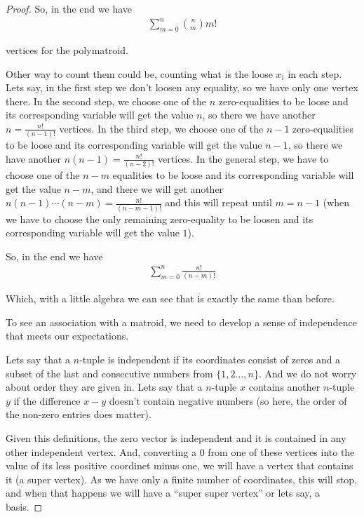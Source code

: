 \begin{proof}
        So, in the end we have
        \begin{align}
                \sum_{m = 0}^n \binom{n}{m} m!
        \end{align}
        
        vertices for the polymatroid.\pn
        
        Other way to count them could be, counting what is the loose $x_i$ in each step. Lets say, in the first step we don't loosen any equality, so 
        we have only one vertex there. In the second step, we choose one of the $n$ zero-equalities to be loose and its corresponding variable will get the value $n$, 
        so there we have another $n = \frac{n!}{(n-1)!}$ vertices. In the third step, we choose one of the $n-1$ zero-equalities to be loose and its corresponding
        variable will get the value $n-1$, so there we have another $n (n-1) = \frac{n!}{(n-2)!}$ vertices. In the general step, we have to choose one of the $n-m$ 
        equalities to be loose and its corresponding variable will get the value $n-m$, and there we will get another $n (n-1) \cdots (n-m) = \frac{n!}{(n-m-1)!}$ and 
        this will repeat until $m = n-1$ (when we have to choose the only remaining zero-equality to be loosen and its corresponding variable will get the value $1$).\pn
        
        So, in the end we have
        \begin{align}
                \sum_{m = 0}^{n} \frac{n!}{(n-m)!}
        \end{align}
        
        Which, with a little algebra we can see that is exactly the same than before.\pn
        
        To see an association with a matroid, we need to develop a sense of independence that meets our expectations.\pn
        
        Lets say that a $n$-tuple is independent if its coordinates consist of zeros and a subset of the last and consecutive numbers from $\{1, 2 \dots, n\}$.
        And we do not worry about order they are given in. Lets say that a $n$-tuple $x$ contains another $n$-tuple $y$ if the difference $x-y$ doesn't contain
        negative numbers (so here, the order of the non-zero entries does matter).\pn
        
        Given this definitions, the zero vector is independent and it is contained in any other independent vertex. And, converting a $0$ from one of these
        vertices into the value of its less positive coordinet minus one, we will have a vertex that contains it (a super vertex). As we have only a finite
        number of coordinates, this will stop, and when that happens we will have a ``super super vertex'' or lets say, a basis.\pn
        

\end{proof}
